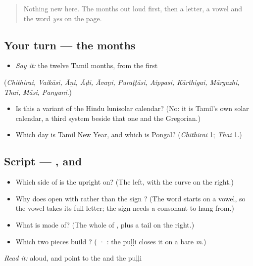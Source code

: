 \label{lesson:TA-C16-checkpoint}



\begin{quote}
Nothing new here. The months out loud first, then a letter, a vowel and the word \emph{yes} on the page.
\end{quote}

\subsection*{Your turn — the months}
\begin{itemize}
\raggedright
  \item \emph{Say it:} the twelve Tamil months, from the first
\end{itemize}

(\emph{Chithirai, Vaikāsi, Āṉi, Āḍi, Āvaṇi, Puraṭṭāsi, Aippasi, Kārthigai, Mārgazhi, Thai, Māsi, Panguṉi}.)

\begin{itemize}
\raggedright
  \item Is this a variant of the Hindu lunisolar calendar? (No: it is Tamil's own solar calendar, a third system beside that one and the Gregorian.)
  \item Which day is Tamil New Year, and which is Pongal? (\emph{Chithirai} 1; \emph{Thai} 1.)
\end{itemize}

\subsection*{Script — ,  and }
\begin{itemize}
\raggedright
  \item Which side of \textbf{} is the upright on? (The left, with the curve on the right.)
  \item Why does \textbf{} open with \textbf{} rather than the sign \textbf{}? (The word starts on a vowel, so the vowel takes its full letter; the sign needs a consonant to hang from.)
  \item What is \textbf{} made of? (The whole of \textbf{}, plus a tail on the right.)
  \item Which two pieces build \textbf{}? (\textbf{} · \textbf{}: the puḷḷi closes it on a bare \emph{m}.)
\end{itemize}

\emph{Read it:} \textbf{} aloud, and point to the  and the puḷḷi


